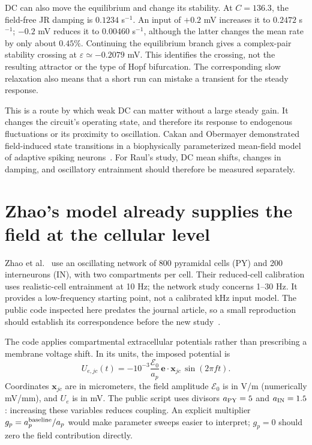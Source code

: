 \documentclass[11pt,a4paper]{article}
\newcommand{\E}{\mathcal E}
\begin{document}
DC can also move the equilibrium and change its stability. At $C=136.3$, the field-free JR damping is $0.1234$ s$^{-1}$. An input of $+0.2$ mV increases it to $0.2472$ s$^{-1}$; $-0.2$ mV reduces it to $0.00460$ s$^{-1}$, although the latter changes the mean rate by only about $0.45\%$. Continuing the equilibrium branch gives a complex-pair stability crossing at $\varepsilon\simeq-0.2079$ mV. This identifies the crossing, not the resulting attractor or the type of Hopf bifurcation. The corresponding slow relaxation also means that a short run can mistake a transient for the steady response.

This is a route by which weak DC can matter without a large steady gain. It changes the circuit's operating state, and therefore its response to endogenous fluctuations or its proximity to oscillation. Cakan and Obermayer demonstrated field-induced state transitions in a biophysically parameterized mean-field model of adaptive spiking neurons~\cite{cakan}. For Raul's study, DC mean shifts, changes in damping, and oscillatory entrainment should therefore be measured separately.

\section{Zhao's model already supplies the field at the cellular level}

Zhao et al.~\cite{zhao} use an oscillating network of 800 pyramidal cells (PY) and 200 interneurons (IN), with two compartments per cell. Their reduced-cell calibration uses realistic-cell entrainment at 10 Hz; the network study concerns 1--30 Hz. It provides a low-frequency starting point, not a calibrated kHz input model. The public code inspected here predates the journal article, so a small reproduction should establish its correspondence before the new study~\cite{zhaocode}.

The code applies compartmental extracellular potentials rather than prescribing a membrane voltage shift. In its units, the imposed potential is
\begin{equation}
U_{e,jc}(t)=-10^{-3}\frac{\E_0}{a_p}
\,\mathbf e\cdot\mathbf x_{jc}\,\sin(2\pi ft).
\label{eq:zhaoinput}
\end{equation}
Coordinates $\mathbf x_{jc}$ are in micrometers, the field amplitude $\E_0$ is in V/m (numerically mV/mm), and $U_e$ is in mV. The public script uses divisors $a_{\rm PY}=5$ and $a_{\rm IN}=1.5$: increasing these variables reduces coupling. An explicit multiplier $g_p=a_p^{\rm baseline}/a_p$ would make parameter sweeps easier to interpret; $g_p=0$ should zero the field contribution directly.
\end{document}

